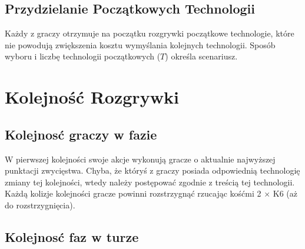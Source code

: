 \documentclass[11pt,a4paper]{article}
\begin{document}
\subsection{Przydzielanie Początkowych Technologii}

Każdy z graczy otrzymuje na początku rozgrywki początkowe technologie, które nie powodują zwiększenia kosztu wymyślania kolejnych technologii. Sposób wyboru i liczbę technologii począt\-kowych ($T$) określa scenariusz.

\section{Kolejność Rozgrywki}

\subsection{Kolejnosć graczy w fazie}

W pierwszej kolejności swoje akcje wykonują gracze o aktualnie najwyższej punktacji zwycięstwa. Chyba, że któryś z graczy posiada odpowiednią technologię zmiany tej kolejności, wtedy należy postępować zgodnie z treścią tej technologii. Każdą kolizje kolejności gracze powinni rozstrzygnąć rzucając kośćmi 2 $\times$ K6 (aż do rozstrzygnięcia).

\subsection{Kolejnosć faz w turze}
\end{document}
